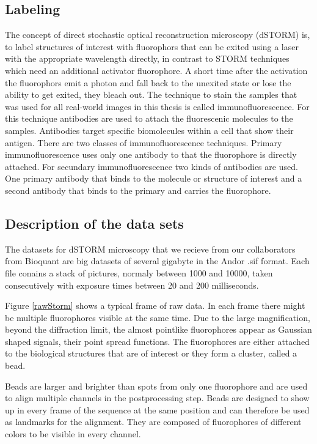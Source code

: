 \subsection{Labeling}
The concept of direct stochastic optical reconstruction microscopy (dSTORM) \cite{heilemann} is, to label structures of interest with fluorophors that can be exited using a laser with the appropriate wavelength directly, in contrast to STORM techniques which need an additional activator fluorophore. A short time after the activation the fluorophors emit a photon and fall back to the unexited state or lose the ability to get exited, they bleach out.\newline
The technique to stain the samples that was used for all real-world images in this thesis is called immunofluorescence. For this technique antibodies are used to attach the fluorescenic molecules to the samples. Antibodies target specific biomolecules within a cell that show their antigen. There are two classes of immunofluorescence techniques.\newline
Primary immunofluorescence uses only one antibody to that the fluorophore is directly attached.\newline
For secundary immunofluorescence two kinds of antibodies are used. One primary antibody that binds to the molecule or structure of interest and a second antibody that binds to the primary and carries the fluorophore.
\subsection{Description of the data sets}
The datasets for dSTORM microscopy that we recieve from our collaborators from
Bioquant are big datasets of several gigabyte in the Andor .sif format. Each
file conains a stack of pictures, normaly between 1000 and 10000, taken
consecutively with exposure times between 20 and 200 milliseconds.\newline

Figure \ref{rawStorm} shows a typical frame of raw data. In each frame there might be multiple fluorophores visible at the same time. Due to the large magnification, beyond the diffraction limit, the almost pointlike fluorophores appear as Gaussian shaped signals, their point spread functions. The fluorophores are either attached to the biological structures that are of interest or they form a cluster, called a bead.\newline

Beads are larger and brighter than spots from only one fluorophore and are used to align multiple channels in the postprocessing step. Beads are designed to show up in every frame of the sequence at the same position and can therefore be used as landmarks for the alignment. They are composed of fluorophores of different colors to be visible in every channel.\newline

